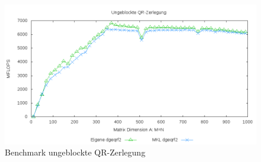 \begin{figure}[H]
	\includegraphics[width=\textwidth]{images/unblk.png}
	\caption{Benchmark ungeblockte QR-Zerlegung}
	\label{img:unblk}
\end{figure}








	 
